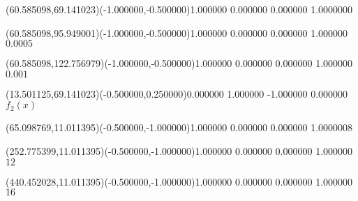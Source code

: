 \documentclass[12pt]{article}
\begin{document}
\fontsize{12.000000}{14.400000}\selectfont%
\ASYalignT(60.585098,69.141023)(-1.000000,-0.500000){1.000000 0.000000 0.000000 1.000000}{\vphantom{$10^4$}$0$}%
%
%
\fontsize{12.000000}{14.400000}\selectfont%
\ASYalignT(60.585098,95.949001)(-1.000000,-0.500000){1.000000 0.000000 0.000000 1.000000}{\vphantom{$10^4$}$0.0005$}%
%
%
\fontsize{12.000000}{14.400000}\selectfont%
\ASYalignT(60.585098,122.756979)(-1.000000,-0.500000){1.000000 0.000000 0.000000 1.000000}{\vphantom{$10^4$}$0.001$}%
%
%
\fontsize{12.000000}{14.400000}\selectfont%
\ASYalignT(13.501125,69.141023)(-0.500000,0.250000){0.000000 1.000000 -1.000000 0.000000}{$f_2(x)$}%
%
%
\fontsize{12.000000}{14.400000}\selectfont%
\ASYalignT(65.098769,11.011395)(-0.500000,-1.000000){1.000000 0.000000 0.000000 1.000000}{\vphantom{$10^4$}$8$}%
%
%
\fontsize{12.000000}{14.400000}\selectfont%
\ASYalignT(252.775399,11.011395)(-0.500000,-1.000000){1.000000 0.000000 0.000000 1.000000}{\vphantom{$10^4$}$12$}%
%
%
\fontsize{12.000000}{14.400000}\selectfont%
\ASYalignT(440.452028,11.011395)(-0.500000,-1.000000){1.000000 0.000000 0.000000 1.000000}{\vphantom{$10^4$}$16$}%
\end{document}
